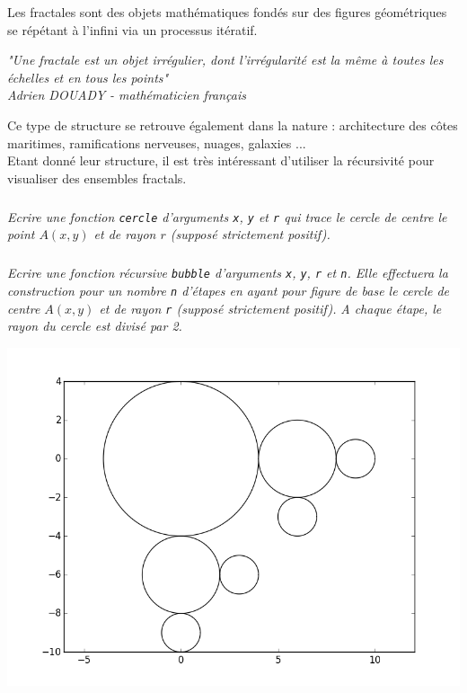 Les fractales sont des objets mathématiques fondés sur des figures géométriques se répétant à l'infini via un processus 
itératif.
\begin{center}
\textit{ "Une fractale est un objet irrégulier, dont l'irrégularité est la même à toutes les échelles et en tous les 
points"
\\
Adrien DOUADY - mathématicien français}
\end{center}
Ce type de structure se retrouve également dans la nature : architecture des côtes maritimes, ramifications nerveuses, 
nuages, galaxies ...
\\
Etant donné leur structure, il est très intéressant d'utiliser la récursivité pour visualiser des ensembles fractals.
\\
\subparagraph{}
\textit{Ecrire une fonction \texttt{cercle} d'arguments \texttt{x}, \texttt{y} et \texttt{r} qui trace le cercle de 
centre le point $A(x, y)$ et de rayon $r$ (supposé strictement positif).}

\subparagraph{}
\textit{Ecrire une fonction récursive \texttt{bubble} d'arguments \texttt{x}, \texttt{y}, \texttt{r} et \texttt{n}. Elle 
effectuera la construction pour un nombre \texttt{n} d'étapes en ayant pour figure de base le cercle de centre $A(x, y)$ 
et de rayon \texttt{r} (supposé strictement positif).}
\textit{A chaque étape, le rayon du cercle est divisé par 2.}
\begin{center}
\includegraphics[width=.65\linewidth]{images/fig_03}
\end{center}

